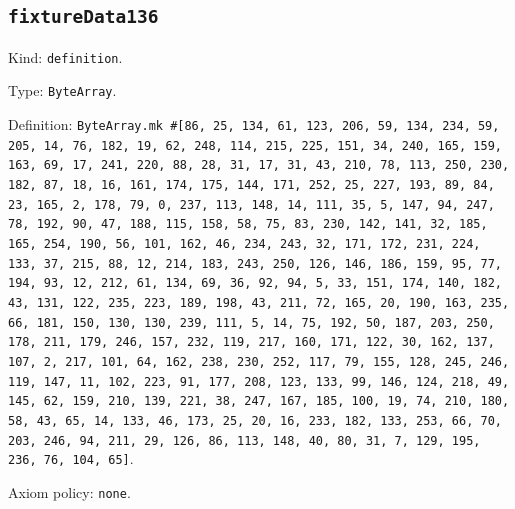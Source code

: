 \documentclass[11pt]{article}
\begin{document}
\subsection*{\texttt{fixtureData136}}
\noindent Kind: \texttt{definition}.\par
\noindent Type: \texttt{ByteArray}.\par
\noindent Definition: \texttt{ByteArray.mk \#[86, 25, 134, 61, 123, 206, 59, 134, 234, 59, 205, 14, 76, 182, 19, 62, 248, 114, 215, 225, 151, 34, 240, 165, 159, 163, 69, 17, 241, 220, 88, 28, 31, 17, 31, 43, 210, 78, 113, 250, 230, 182, 87, 18, 16, 161, 174, 175, 144, 171, 252, 25, 227, 193, 89, 84, 23, 165, 2, 178, 79, 0, 237, 113, 148, 14, 111, 35, 5, 147, 94, 247, 78, 192, 90, 47, 188, 115, 158, 58, 75, 83, 230, 142, 141, 32, 185, 165, 254, 190, 56, 101, 162, 46, 234, 243, 32, 171, 172, 231, 224, 133, 37, 215, 88, 12, 214, 183, 243, 250, 126, 146, 186, 159, 95, 77, 194, 93, 12, 212, 61, 134, 69, 36, 92, 94, 5, 33, 151, 174, 140, 182, 43, 131, 122, 235, 223, 189, 198, 43, 211, 72, 165, 20, 190, 163, 235, 66, 181, 150, 130, 130, 239, 111, 5, 14, 75, 192, 50, 187, 203, 250, 178, 211, 179, 246, 157, 232, 119, 217, 160, 171, 122, 30, 162, 137, 107, 2, 217, 101, 64, 162, 238, 230, 252, 117, 79, 155, 128, 245, 246, 119, 147, 11, 102, 223, 91, 177, 208, 123, 133, 99, 146, 124, 218, 49, 145, 62, 159, 210, 139, 221, 38, 247, 167, 185, 100, 19, 74, 210, 180, 58, 43, 65, 14, 133, 46, 173, 25, 20, 16, 233, 182, 133, 253, 66, 70, 203, 246, 94, 211, 29, 126, 86, 113, 148, 40, 80, 31, 7, 129, 195, 236, 76, 104, 65]}.\par
\noindent Axiom policy: \texttt{none}.\par
\end{document}
